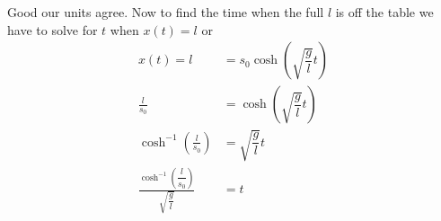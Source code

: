 \documentclass[11pt]{article}
\numberwithin{equation}{section}
\begin{document}
Good our units agree. Now to find the time when the full $l$ is off the table we have to solve for $t$ when $x(t)=l$ or 
\begin{align*}
x(t) = l &= s_0\cosh\left(\sqrt{\dfrac{g}{l}}t\right)\\
\frac{l}{s_0} &= \cosh\left(\sqrt{\dfrac{g}{l}}t\right)\\
\cosh^{-1}\left(\frac{l}{s_0}\right) &= \sqrt{\dfrac{g}{l}}t\\
\frac{\cosh^{-1}\left(\dfrac{l}{s_0}\right)}{\sqrt{\dfrac{g}{l}}} &=t\\
\end{align*}
\end{document}
